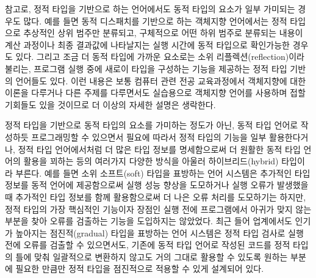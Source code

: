 참고로, 정적 타입을 기반으로 하는 언어에서도 동적 타입의 요소가 일부
가미되는 경우도 많다. 예를 들면 동적 디스패치를 기반으로 하는
객체지향 언어에서는 정적 타입으로 추상적인 상위 범주만 분류되고,
구체적으로 어떤 하위 범주로 분류되는 내용이 계산 과정이나 최종 결과값에
나타날지는 실행 시간에 동적 타입으로 확인가능한 경우도 있다. 그리고
조금 더 동적 타입에 가까운 요소로는 소위 리플렉션(reflection)이라 불리는,
프로그램 실행 중에 새로이 타입을 구성하는 기능을 제공하는 정적 타입 기반의
언어들도 있다. 이런 내용은 보통 컴퓨터 관련 전공 교육과정에서 객체지향에
대한 이론을 다루거나 다른 주제를 다루면서도 실습용으로 객체지향 언어를
사용하며 접할 기회들도 있을 것이므로 더 이상의 자세한 설명은 생락한다.

정적 타입을 기반으로 동적 타입의 요소를 가미하는 정도가 아닌,
동적 타입 언어로 작성하듯 프로그래밍할 수 있으면서 필요에 따라서
정적 타입의 기능을 일부 활용한다거나, 정적 타입 언어에서처럼
더 많은 타입 정보를 명세함으로써 더 원활한 동적 타입 언어의 활용을
꾀하는 등의 여러가지 다양한 방식을 아울러 하이브리드(hybrid) 타입이라
부른다. 예를 들면 소위 소프트(soft) 타입\cite{Cartwright2004soft}을
표방하는 언어 시스템은 추가적인 타입 정보를 동적 언어에 제공함으로써
실행 성능 향상을 도모하거나 실행 오류가 발생했을 때 추가적인 타입 정보를
함께 활용함으로써 더 나은 오류 처리를 도모하기는 하지만, 정적 타입의
가장 핵심적인 기능이자 장점인 실행 전에 프로그램에서 아귀가 맞지 않는
부분을 찾아 오류를 검출하는 기능을 도입하지는 않았었다. 최근 들어
업계에서도 인기가 높아지는 점진적(gradual) 타입\cite{Jeremy2006gradual}을
표방하는 언어 시스템은 정적 타입 검사로 실행 전에 오류를 검출할 수
있으면서도, 기존에 동적 타입 언어로 작성된 코드를 정적 타입의 틀에 맞춰
일괄적으로 변환하지 않고도 거의 그대로 활용할 수 있도록 원하는 부분에
필요한 만큼만 정적 타입을 점진적으로 적용할 수 있게 설계되어 있다.

